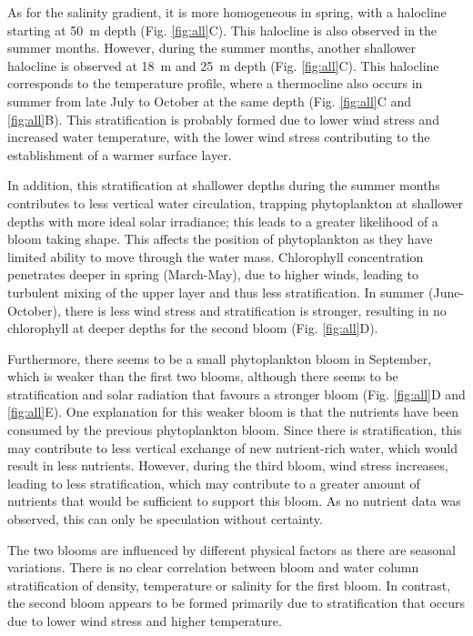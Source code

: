 \documentclass[../Main.tex]{subfiles}
\begin{document}
As for the salinity gradient, it is more homogeneous in spring, with a halocline starting at \SI{50}{m} depth (Fig. \ref{fig:all}C). This halocline is also observed in the summer months. However, during the summer months, another shallower halocline is observed at \SI{18}{m} and \SI{25}{m} depth (Fig. \ref{fig:all}C). This halocline corresponds to the temperature profile, where a thermocline also occurs in summer from late July to October at the same depth (Fig. \ref{fig:all}C and \ref{fig:all}B). This stratification is probably formed due to lower wind stress and increased water temperature, with the lower wind stress contributing to the establishment of a warmer surface layer\supercite{carey2012eco}.

In addition, this stratification at shallower depths during the summer months contributes to less vertical water circulation, trapping phytoplankton at shallower depths with more ideal solar irradiance; this leads to a greater likelihood of a bloom taking shape. This affects the position of phytoplankton as they have limited ability to move through the water mass\supercite{kase2018phytoplankton}.
Chlorophyll concentration penetrates deeper in spring (March-May), due to higher winds, leading to turbulent mixing of the upper layer and thus less stratification. In summer (June-October), there is less wind stress and stratification is stronger, resulting in no chlorophyll at deeper depths for the second bloom (Fig. \ref{fig:all}D).

Furthermore, there seems to be a small phytoplankton bloom in September, which is weaker than the first two blooms, although there seems to be stratification and solar radiation that favours a stronger bloom (Fig. \ref{fig:all}D and \ref{fig:all}E). One explanation for this weaker bloom is that the nutrients have been consumed by the previous phytoplankton bloom. Since there is stratification, this may contribute to less vertical exchange of new nutrient-rich water, which would result in less nutrients. However, during the third bloom, wind stress increases, leading to less stratification, which may contribute to a greater amount of nutrients that would be sufficient to support this bloom.  As no nutrient data was observed, this can only be speculation without certainty. 

The two blooms are influenced by different physical factors as there are seasonal variations. There is no clear correlation between bloom and water column stratification of density, temperature or salinity for the first bloom. In contrast, the second bloom appears to be formed primarily due to stratification that occurs due to lower wind stress and higher temperature.


\end{document}
